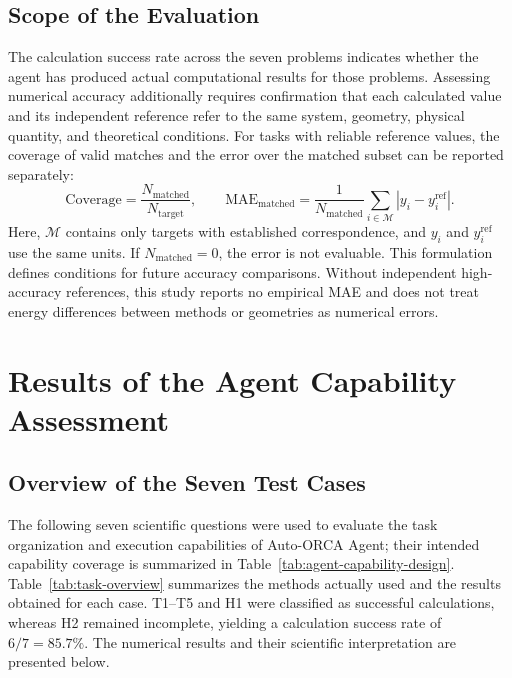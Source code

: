 \documentclass[a4paper,11pt]{article}
\begin{document}
\subsection{Scope of the Evaluation}
The calculation success rate across the seven problems indicates whether the agent has produced actual computational results for those problems.
Assessing numerical accuracy additionally requires confirmation that each calculated value and its independent reference
refer to the same system, geometry, physical quantity, and theoretical conditions.
For tasks with reliable reference values, the coverage of valid matches and the error over the matched subset can be reported separately:
\begin{equation}
  \mathrm{Coverage}=\frac{N_{\mathrm{matched}}}{N_{\mathrm{target}}},
  \qquad
  \mathrm{MAE}_{\mathrm{matched}}=
  \frac{1}{N_{\mathrm{matched}}}\sum_{i\in\mathcal M}|y_i-y_i^{\mathrm{ref}}|.
  \label{eq:coverage-accuracy}
\end{equation}
Here, $\mathcal M$ contains only targets with established correspondence,
and $y_i$ and $y_i^{\mathrm{ref}}$ use the same units.
If $N_{\mathrm{matched}}=0$, the error is not evaluable.
This formulation defines conditions for future accuracy comparisons.
Without independent high-accuracy references, this study reports no empirical MAE
and does not treat energy differences between methods or geometries as numerical errors.

\section{Results of the Agent Capability Assessment}
\subsection{Overview of the Seven Test Cases}
The following seven scientific questions were used to evaluate the task organization and execution capabilities of Auto-ORCA Agent;
their intended capability coverage is summarized in Table~\ref{tab:agent-capability-design}.
Table~\ref{tab:task-overview} summarizes the methods actually used and the results obtained for each case.
T1--T5 and H1 were classified as successful calculations, whereas H2 remained incomplete, yielding a calculation success rate of $6/7=85.7\%$.
The numerical results and their scientific interpretation are presented below.
\end{document}
